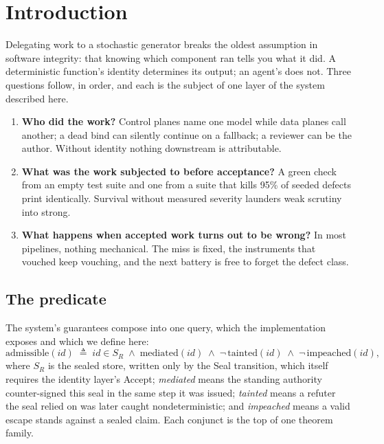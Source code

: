 \documentclass[11pt,a4paper]{article}
\theoremstyle{plain}
\theoremstyle{definition}
\theoremstyle{remark}
\newcommand{\adm}{\ensuremath{\mathrm{admissible}}}
\newcommand{\SR}{\ensuremath{S_R}}
\begin{document}
\section{Introduction}
\label{sec:intro}

Delegating work to a stochastic generator breaks the oldest assumption in software integrity: that knowing which component ran tells you what it did. A deterministic function's identity determines its output; an agent's does not. Three questions follow, in order, and each is the subject of one layer of the system described here.

\begin{enumerate}[leftmargin=*,itemsep=2pt]
  \item \textbf{Who did the work?} Control planes name one model while data planes call another; a dead bind can silently continue on a fallback; a reviewer can be the author. Without identity nothing downstream is attributable.
  \item \textbf{What was the work subjected to before acceptance?} A green check from an empty test suite and one from a suite that kills 95\% of seeded defects print identically. Survival without measured severity launders weak scrutiny into strong.
  \item \textbf{What happens when accepted work turns out to be wrong?} In most pipelines, nothing mechanical. The miss is fixed, the instruments that vouched keep vouching, and the next battery is free to forget the defect class.
\end{enumerate}

\subsection{The predicate}

The system's guarantees compose into one query, which the implementation exposes and which we define here:
\begin{equation}
  \adm(\mathit{id}) \;\triangleq\; \mathit{id} \in \SR \;\wedge\; \mathrm{mediated}(\mathit{id}) \;\wedge\; \neg\,\mathrm{tainted}(\mathit{id}) \;\wedge\; \neg\,\mathrm{impeached}(\mathit{id}),
  \label{eq:pred}
\end{equation}
where $\SR$ is the sealed store, written only by the Seal transition, which itself requires the identity layer's Accept; \emph{mediated} means the standing authority counter-signed this seal in the same step it was issued; \emph{tainted} means a refuter the seal relied on was later caught nondeterministic; and \emph{impeached} means a valid escape stands against a sealed claim. Each conjunct is the top of one theorem family.
\end{document}
